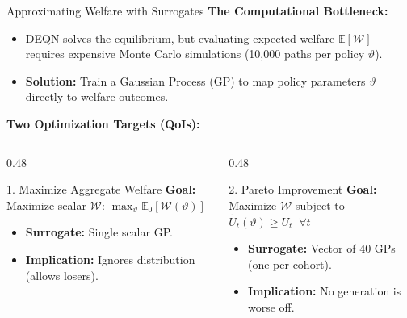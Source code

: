 \documentclass[aspectratio=169,11pt]{beamer}
\newcommand{\keyc}[1]{\textcolor{uzhblue}{#1}}
\begin{document}
\begin{frame}{Approximating Welfare with Surrogates}
\footnotesize
    \textbf{The Computational Bottleneck:}
    \begin{itemize}\itemsep1pt
        \item DEQN solves the equilibrium, but evaluating expected welfare $\mathbb{E}[\mathcal{W}]$ requires expensive Monte Carlo simulations (10,000 paths per policy $\vartheta$).
        \item \textbf{Solution:} Train a \keyc{Gaussian Process (GP)} to map policy parameters $\vartheta$ directly to welfare outcomes.
    \end{itemize}
    \vspace{0.1em}
    \textbf{Two Optimization Targets (QoIs):}
    \begin{columns}[t]
        \begin{column}{0.48\textwidth}
            \begin{block}{1. Maximize Aggregate Welfare}
                \footnotesize
                \textbf{Goal:} Maximize scalar $\mathcal{W}$: \; $\max_\vartheta \mathbb{E}_0[\mathcal{W}(\vartheta)]$
                \begin{itemize}
                    \item \textbf{Surrogate:} Single scalar GP.
                    \item \textbf{Implication:} Ignores distribution (allows losers).
                \end{itemize}
            \end{block}
        \end{column}
        \begin{column}{0.48\textwidth}
            \begin{block}{2. Pareto Improvement}
                \footnotesize
                \textbf{Goal:} Maximize $\mathcal{W}$ subject to $\tilde{U}_t(\vartheta) \ge U_t \;\; \forall t$
                \begin{itemize}
                    \item \textbf{Surrogate:} Vector of 40 GPs (one per cohort).
                    \item \textbf{Implication:} No generation is worse off.
                \end{itemize}
            \end{block}
        \end{column}
    \end{columns}
\end{frame}
\end{document}
